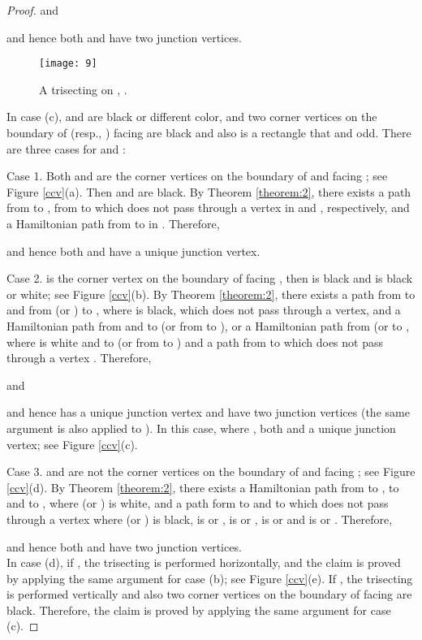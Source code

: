 \documentclass[preprint,12pt]{elsarticle}
\begin{document}
\begin{proof}
and

and hence both  and  have two junction
vertices.\\
\begin{figure}[tb]
  \centering
  \texttt{[image: 9]}
  \caption[]{\small A trisecting on , .}
  \label{cc}
\end{figure}
In case (c),  and  are black or different color, and two
corner vertices on the boundary of  (resp., )
facing  are black and also  is a rectangle
that  and odd. There are three cases for  and :
\par Case 1. Both  and  are the corner vertices on the boundary
of  and  facing ; see Figure
\ref{ccv}(a). Then  and  are black. By Theorem
\ref{theorem:2}, there exists a path from  to , from
 to  which does not pass through a vertex in 
and , respectively, and a Hamiltonian path from 
to  in . Therefore,

and hence both  and  have a unique junction
vertex.
\par Case 2.  is the corner vertex on the boundary of 
facing , then  is black and  is black or white; see
Figure \ref{ccv}(b). By Theorem \ref{theorem:2}, there exists a path
from  to  and from  (or ) to , where 
is black, which does not pass through a vertex, and a Hamiltonian
path from and 
to  (or from  to ), or a Hamiltonian path from  (or  to , where  is white and 
to  (or from  to ) and a path
from  to  which does not pass through a vertex . Therefore,

and

and hence  has a unique junction vertex and  have
two junction vertices (the same argument is also applied to ). In
this case, where , both  and  a unique
junction vertex; see Figure \ref{ccv}(c).
\par Case 3.  and  are not the corner vertices on the
boundary of  and  facing ; see
Figure \ref{ccv}(d). By Theorem \ref{theorem:2}, there exists a
Hamiltonian path from  to ,  to  and  to ,
where  (or ) is white, and a path form  to  and  to
 which does not pass through a vertex where  (or ) is
black,  is  or ,  is  or ,  is  or  and  is  or . Therefore,

and hence both  and  have two junction
vertices.\\
In case (d), if , the trisecting is performed
horizontally, and the claim is proved by applying the same argument
for case (b); see Figure \ref{ccv}(e). If , the trisecting
is performed vertically
and also
two corner vertices on the boundary of  facing
 are black. Therefore, the claim is proved by applying
the same argument for case (c).
\end{proof}
\end{document}
